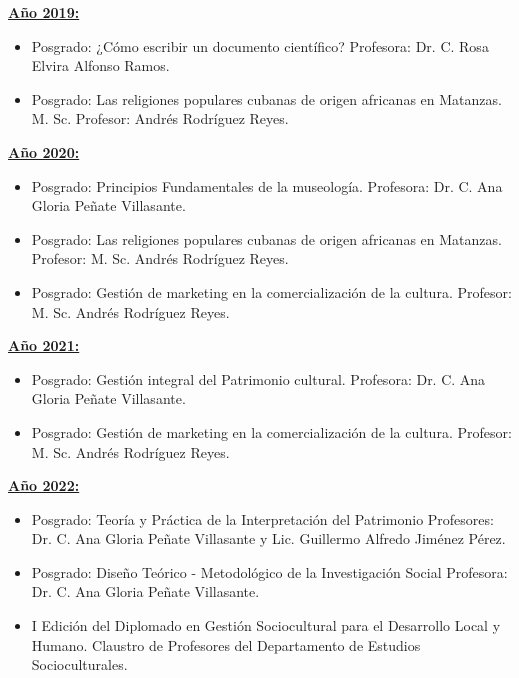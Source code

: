 \underline{\textbf{Año 2019:}}

\begin{itemize}
	\setlength\itemsep{-0.5em}
	\item Posgrado: ¿Cómo escribir un documento científico? Profesora: Dr. C. Rosa Elvira Alfonso Ramos.
	\item Posgrado: Las religiones populares cubanas de origen africanas en Matanzas. M. Sc. Profesor: Andrés Rodríguez Reyes. 
\end{itemize}

\underline{\textbf{Año 2020:}}

\begin{itemize}
	\setlength\itemsep{-0.5em}
	\item Posgrado: Principios Fundamentales de la museología. Profesora: Dr. C. Ana Gloria Peñate Villasante.
	\item Posgrado: Las religiones populares cubanas de origen africanas en Matanzas. Profesor: M. Sc. Andrés Rodríguez Reyes.
	\item Posgrado: Gestión de marketing en la comercialización de la cultura. Profesor: M. Sc. Andrés Rodríguez Reyes. 
\end{itemize}

\underline{\textbf{Año 2021:}}

\begin{itemize}
	\setlength\itemsep{-0.5em}
	\item Posgrado: Gestión integral del Patrimonio cultural. Profesora: Dr. C. Ana Gloria Peñate Villasante.
	\item Posgrado: Gestión de marketing en la comercialización de la cultura. Profesor: M. Sc. Andrés Rodríguez Reyes.
\end{itemize}

\underline{\textbf{Año 2022:}}

\begin{itemize}
	\setlength\itemsep{-0.5em}
	\item Posgrado: Teoría y Práctica de la Interpretación del Patrimonio Profesores: Dr. C. Ana Gloria Peñate Villasante y Lic. Guillermo Alfredo Jiménez Pérez.
	\item Posgrado: Diseño Teórico - Metodológico de la Investigación Social Profesora: Dr. C. Ana Gloria Peñate Villasante.
	\item I Edición del Diplomado en Gestión Sociocultural para el Desarrollo Local y Humano. Claustro de Profesores del Departamento de Estudios Socioculturales.
\end{itemize}

